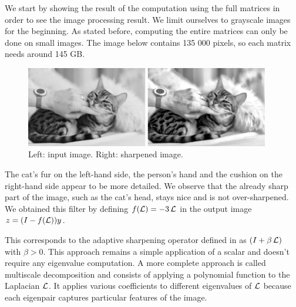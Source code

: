 We start by showing the result of the computation using the full matrices in order to see the image processing result.
We limit ourselves to grayscale images for the beginning.
As stated before, computing the entire matrices can only be done on small images.
The image below contains 135 000 pixels, so each matrix needs around 145 GB.

\begin{figure}[H]
  \centering
  \includegraphics[width=0.95\textwidth]{img/cat.png}
  \caption{Left: input image. Right: sharpened image.}
\end{figure}

The cat's fur on the left-hand side, the person's hand and the cushion on the right-hand side appear to be more detailed.
We observe that the already sharp part of the image, such as the cat's head, stays nice and is not over-sharpened.
We obtained this filter by defining \(f(\operatorname{\mathcal{L}}) = -3\operatorname{\mathcal{L}}\) in the output image \(z = (I - f(\operatorname{\mathcal{L}}))y\).

This corresponds to the adaptive sharpening operator defined in \cite{siam_slides_2016} as \((I + \beta \operatorname{\mathcal{L}})\) with \(\beta > 0\).
This approach remains a simple application of a scalar and doesn't require any eigenvalue computation.
A more complete approach is called multiscale decomposition \cite{talebi_nonlocal_2014} and consists of applying a polynomial function to the Laplacian \(\operatorname{\mathcal{L}}\).
It applies various coefficients to different eigenvalues of \(\operatorname{\mathcal{L}}\) because each eigenpair captures particular features of the image.
